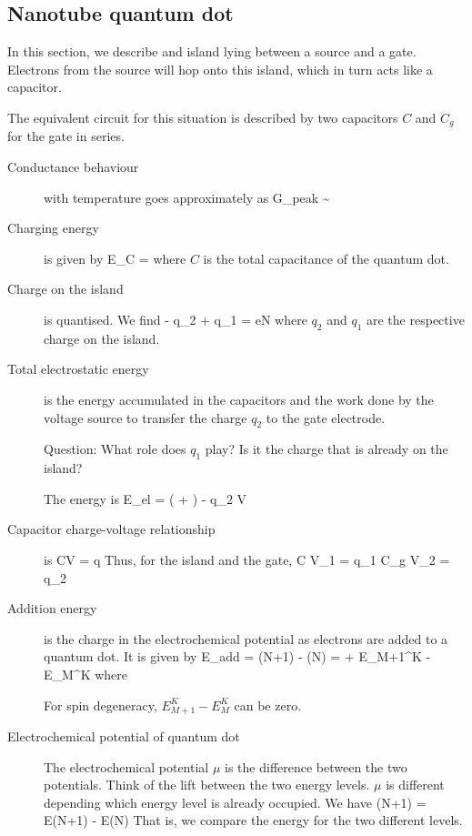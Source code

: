 \subsection{Nanotube quantum dot}
In this section, we describe and island lying between a source and a gate. Electrons from the source will hop onto this island, which in turn acts like a capacitor. 

The equivalent circuit for this situation is described by two capacitors $C$ and $C_g$ for the gate in series. 

\begin{description}
\item[Conductance behaviour] with temperature goes approximately as
\beq
G_{peak} \sim {}
\eeq

\item[Charging energy] is given by 
\beq
E_C = 
\eeq
where $C$ is the total capacitance of the quantum dot. 

\item[Charge on the island] is quantised. We find
\beq
- q_2 + q_1 = eN
\eeq
where $q_2$ and $q_1$ are the respective charge on the island. 

\item[Total electrostatic energy] is the energy accumulated in the capacitors and the work done by the voltage source to transfer the charge $q_2$ to the gate electrode. 

Question: What role does $q_1$ play? Is it the charge that is already on the island? 

The energy is
\beq
E_{el} =  \left(  +  \right) - q_2 V
\eeq

\item[Capacitor charge-voltage relationship] is
\beq
CV = q
\eeq
Thus, for the island and the gate, 
\beq
C V_1 = q_1
\eeq
\beq
C_g V_2 = q_2
\eeq


\item[Addition energy] is the charge in the electrochemical potential as electrons are added to a quantum dot. It is given by 
\beq
\Delta E_{add} = \mu(N+1) - \mu(N) =  + E_{M+1}^K - E_M^K
\eeq
where 

For spin degeneracy, $E_{M+1}^K - E_M^K$ can be zero. 

\item[Electrochemical potential of quantum dot] The electrochemical potential $\mu$ is the difference between the two potentials. Think of the lift between the two energy levels. $\mu$ is different depending which energy level is already occupied.  We have
\beq
\mu(N+1) = E(N+1) - E(N)
\eeq
That is, we compare the energy for the two different levels. 




\end{description}

